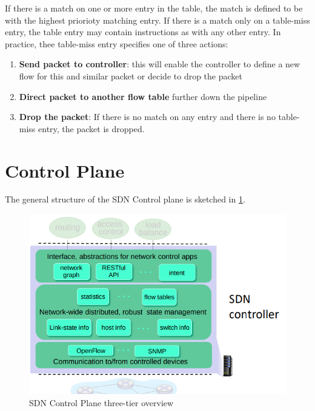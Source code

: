 \documentclass[10pt,a4paper]{report}
\theoremstyle{definition}
\begin{document}
If there is a match on one or more entry in the table, the match is defined to be with the highest priorioty matching entry. 
If there is a match only on a table-miss entry, the table entry may contain instructions as with any other entry. In practice, thee table-miss entry specifies one of three actions:
\begin{enumerate}
	\item 
	\textbf{Send packet to controller}: this will enable the controller to define a new flow for this  and similar packet or decide to drop the packet
	\item 
	\textbf{Direct packet to another flow table} further down the pipeline
	\item 
	\textbf{Drop the packet}: If there is no match on any entry and there is no table-miss entry, the packet is dropped.
\end{enumerate}

\section{Control Plane}\label{sec:sdn-control-plane}
The general structure of the SDN Control plane is sketched in \ref{sdn-control-plane}.
\begin{figure}[h!]
	\centering\includegraphics[scale=0.50]{images/Pasted image 20230324115208.png}
	\caption{SDN Control Plane three-tier overview}
\label{sdn-control-plane}
\end{figure}
\end{document}
